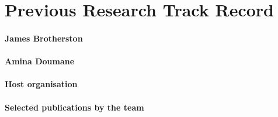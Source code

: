 \section{Previous Research Track Record}

\paragraph{James Brotherston}

\paragraph{Amina Doumane}

\paragraph{Host organisation}

\paragraph{Selected publications by the team}
